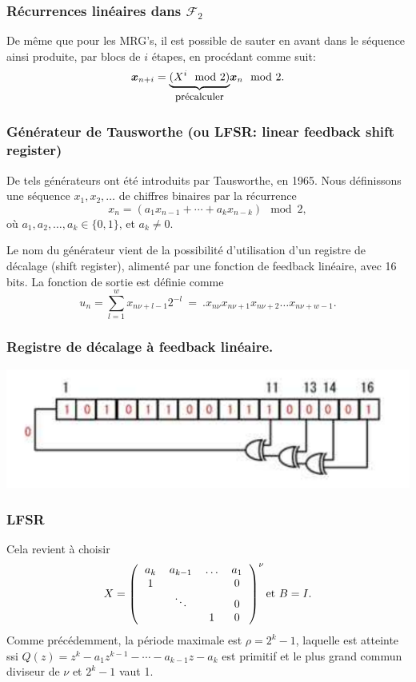 \documentclass[t,usepdftitle=false]{beamer}
\def\bx{\boldsymbol{x}}
\begin{document}
\begin{frame}
\frametitle{Récurrences linéaires dans $\mathcal{F}_2$}

De même que pour les MRG's, il est possible de sauter en avant dans le
séquence ainsi produite, par blocs de ${i}$ étapes, en procédant comme
suit:
\[
 \bx_{n+i} = {\underbrace{(X^i \mod 2)}_{
           \mbox{{\small précalculer}}}} \bx_n \mod 2.
\]

\end{frame}

\begin{frame}
\frametitle{Générateur de Tausworthe (ou LFSR: linear feedback shift register)}

De tels générateurs ont été introduits par Tausworthe, en 1965.
Nous définissons une séquence $x_1, x_2, \ldots$ de chiffres binaires
par la récurrence
\[
 x_n = (a_1 x_{n-1} + \cdots + a_k x_{n-k}) \mod 2,
\]
où $a_1, a_2,\ldots, a_k \in \lbrace 0, 1 \rbrace$, et $a_k \ne 0$.

\mbox{}

Le nom du générateur vient de la possibilité d'utilisation d'un
registre de décalage (shift register), alimenté par une fonction de
feedback linéaire, avec
16 bits. La fonction de sortie est définie comme
\[
 u_n = \sum_{l=1}^w x_{n\nu+l-1} 2^{-l} 
     ~=~ .x_{n\nu} x_{n\nu+1} x_{n\nu+2} \ldots x_{n\nu+w-1}.
\]

\end{frame}

\begin{frame}
\frametitle{Registre de décalage à feedback linéaire.}

\begin{center}
\includegraphics{lfsr_16.pdf}
\end{center}
\label{fig:lfsr}

\end{frame}

\begin{frame}
\frametitle{LFSR}


Cela revient à choisir
\[
 X =
\left(
\begin{tabular}{cccc}
$a_k$    &$a_{k-1}$ & $\ldots$ & $a_1$  \\
1        &          &   & 0     \\
         & $\ddots$ &   & 0      \\
         &          & 1 & 0
\end{tabular}
\right)^\nu \mbox{et } B=I.
\]
Comme précédemment, la période maximale est $\rho = 2^k-1$, laquelle
est atteinte ssi ${Q(z)} = z^k - a_1 z^{k-1} - \cdots - a_{k-1} z - a_k$
est primitif et le plus grand commun diviseur de $\nu$ et $2^k-1$ vaut 1.


\end{frame}
\end{document}
